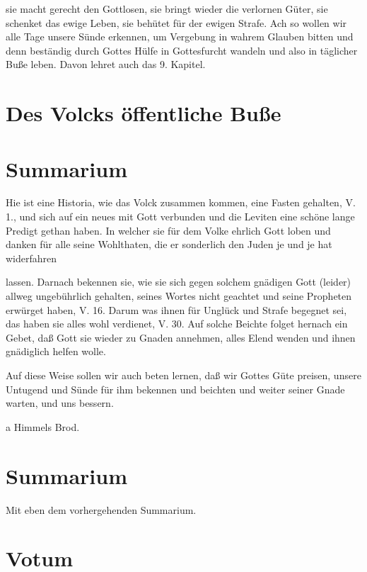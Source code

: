 sie macht gerecht den Gottlosen, sie bringt wieder die verlornen Güter, sie schenket das ewige Leben, sie behütet für der ewigen Strafe. Ach so wollen wir alle Tage unsere Sünde erkennen, um Vergebung in wahrem Glauben bitten und denn beständig durch Gottes Hülfe in Gottesfurcht wandeln und also in täglicher Buße leben. Davon lehret auch das 9. Kapitel.

\section{Des Volcks öffentliche Buße}

\section{Summarium}

Hie ist eine Historia, wie das Volck zusammen kommen, eine Fasten gehalten, V. 1., und sich auf ein neues mit Gott verbunden und die Leviten eine schöne lange Predigt gethan haben. In welcher sie für dem Volke ehrlich Gott loben und danken für alle seine Wohlthaten, die er sonderlich den Juden je und je hat widerfahren

lassen. Darnach bekennen sie, wie sie sich gegen solchem gnädigen Gott (leider) allweg ungebührlich gehalten, seines Wortes nicht geachtet und seine Propheten erwürget haben, V. 16. Darum was ihnen für Unglück und Strafe begegnet sei, das haben sie alles wohl verdienet, V. 30. Auf solche Beichte folget hernach ein Gebet, daß Gott sie wieder zu Gnaden annehmen, alles Elend wenden und ihnen gnädiglich helfen wolle.

Auf diese Weise sollen wir auch beten lernen, daß wir Gottes Güte preisen, unsere Untugend und Sünde für ihm bekennen und beichten und weiter seiner Gnade warten, und uns bessern.

a Himmels Brod.


\section{Summarium}

Mit eben dem vorhergehenden Summarium.

\section{Votum}

